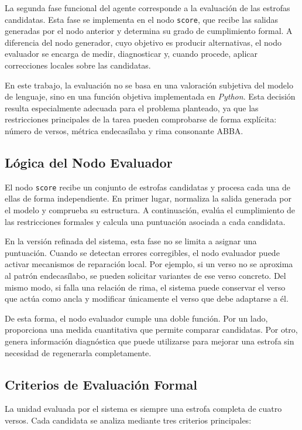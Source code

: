 \documentclass[12pt,a4paper,twoside,openright]{book}
\begin{document}
La segunda fase funcional del agente corresponde a la evaluación de las estrofas candidatas. Esta fase se implementa en el nodo \texttt{score}, que recibe las salidas generadas por el nodo anterior y determina su grado de cumplimiento formal.
A diferencia del nodo generador, cuyo objetivo es producir alternativas, el nodo evaluador se encarga de medir, diagnosticar y, cuando procede, aplicar correcciones locales sobre las candidatas.

En este trabajo, la evaluación no se basa en una valoración subjetiva del modelo de lenguaje, sino en una función objetiva implementada en \emph{Python}.
Esta decisión resulta especialmente adecuada para el problema planteado, ya que las restricciones principales de la tarea pueden comprobarse de forma explícita: número de versos, métrica endecasílaba y rima consonante ABBA.


\subsection{Lógica del Nodo Evaluador}

El nodo \texttt{score} recibe un conjunto de estrofas candidatas y procesa cada una de ellas de forma independiente. En primer lugar, normaliza la salida generada por el modelo y comprueba su estructura.
A continuación, evalúa el cumplimiento de las restricciones formales y calcula una puntuación asociada a cada candidata.

En la versión refinada del sistema, esta fase no se limita a asignar una puntuación. Cuando se detectan errores corregibles, el nodo evaluador puede activar mecanismos de reparación local.
Por ejemplo, si un verso no se aproxima al patrón endecasílabo, se pueden solicitar variantes de ese verso concreto. Del mismo modo, si falla una relación de rima, el sistema puede conservar el verso que actúa como ancla y modificar únicamente el verso que debe adaptarse a él.

De esta forma, el nodo evaluador cumple una doble función. Por un lado, proporciona una medida cuantitativa que permite comparar candidatas. Por otro, genera información diagnóstica que puede utilizarse para mejorar una estrofa sin necesidad de regenerarla completamente.


\subsection{Criterios de Evaluación Formal}

La unidad evaluada por el sistema es siempre una estrofa completa de cuatro versos. Cada candidata se analiza mediante tres criterios principales:
\end{document}
